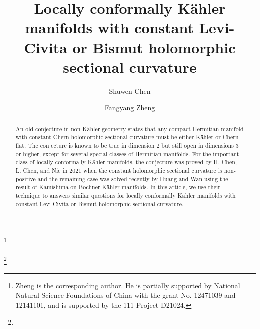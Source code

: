 \documentclass{amsart}
\numberwithin{equation}{section}
\begin{document}
\title[Locally conformally K\"ahler manifolds with constant Levi-Civita or Bismut holomorphic sectional curvature]
{Locally conformally K\"ahler manifolds with constant Levi-Civita or Bismut holomorphic sectional curvature}

\author{Shuwen Chen}
\address{Shuwen Chen. School of Mathematical Sciences, Chongqing Normal University, Chongqing 401331, China}
\thanks{Zheng is the corresponding author. He is partially supported by National Natural Science Foundations of China
with the grant No. 12471039 and  12141101, and is supported by the 111 Project D21024.}
	

\author{Fangyang Zheng}
\address{Fangyang Zheng. School of Mathematical Sciences, Chongqing Normal University, Chongqing 401331, China}
 \thanks{}

\date{}



\begin{abstract}
An old conjecture in non-K\"ahler geometry states that any compact Hermitian manifold with constant Chern holomorphic sectional curvature must be either K\"ahler or Chern flat. The conjecture is known to be true in dimension 2 but still open in dimensions 3 or higher, except for several special classes of Hermitian manifolds. For the important class of locally conformally K\"ahler manifolds, the conjecture was proved by H. Chen, L. Chen, and Nie in 2021 when the constant holomorphic sectional curvature is non-positive and the remaining case was solved recently by Huang and Wan using the result of Kamishima on Bochner-K\"ahler manifolds. In this article, we use their technique to answers similar questions for locally conformally K\"ahler manifolds with constant Levi-Civita or Bismut holomorphic sectional curvature.
\end{abstract}


\maketitle

\end{document}
